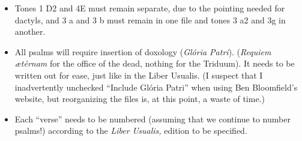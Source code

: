 \documentclass[11pt]{article}
\begin{document}
\begin{itemize}
\item Tones 1 D2 and 4E must remain separate, due to the pointing needed for dactyls, and 3 a and 3 b must remain in one file and tones 3 a2 and 3g in another.
  \item All psalms will require insertion of doxology (\textit{Glória Patri}). (\textit{Requiem ætérnam} for the office of the dead, nothing for the Triduum). It needs to be written out for ease, just like in the Liber Usualis. (I suspect that I inadvertently unchecked ``Include Glória Patri'' when using Ben Bloomfield's website, but reorganizing the files is, at this point, a waste of time.)
 \item Each ``verse'' needs to be numbered (assuming that we continue to number psalms!) according to the \textit{Liber Usualis,} edition to be specified.
 

\end{itemize}
\end{document}
